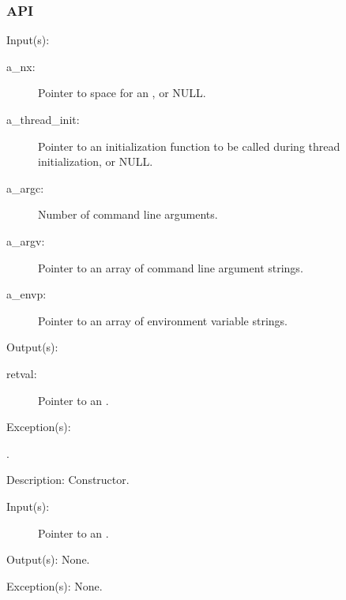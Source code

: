 \subsubsection{API}
\begin{capi}
\label{nx_new}
	\begin{capilist}
	\item[Input(s): ]
		\begin{description}\item[]
		\item[a\_nx: ]
			Pointer to space for an , or NULL.
		\item[a\_thread\_init: ]
			Pointer to an initialization function to be called
			during thread initialization, or NULL.
		\item[a\_argc: ]
			Number of command line arguments.
		\item[a\_argv: ]
			Pointer to an array of command line argument strings.
		\item[a\_envp: ]
			Pointer to an array of environment variable strings.
		\end{description}
	\item[Output(s): ]
		\begin{description}\item[]
		\item[retval: ]
			Pointer to an .
		\end{description}
	\item[Exception(s): ]
		\begin{description}\item[]
		\item[.]
		\end{description}
	\item[Description: ]
		Constructor.
	\end{capilist}
\label{nx_delete}
	\begin{capilist}
	\item[Input(s): ]
		\begin{description}\item[]
			Pointer to an \classname{nx}.
		\end{description}
	\item[Output(s): ] None.
	\item[Exception(s): ] None.

\end{capilist}
\end{capi}
